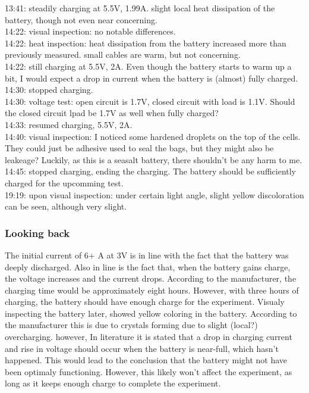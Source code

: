 13:41: steadily charging at 5.5V, 1.99A. slight local heat dissipation of the battery, though not even near concerning.\\
14:22: visual inspection: no notable differences.\\
14:22: heat inspection: heat dissipation from the battery increased more than previously measured. small cables are warm, but not concerning.\\
14:22: still charging at 5.5V, 2A. Even though the battery starts to warm up a bit, I would expect a drop in current when the battery is (almost) fully charged.\\
14:30: stopped charging.\\
14:30: voltage test: open circuit is 1.7V, closed circuit with load is 1.1V. Should the closed circuit lpad be 1.7V as well when fully charged?\\
14:33: resumed charging, 5.5V, 2A.\\
14:40: visual inspection: I noticed some hardened droplets on the top of the cells. They could just be adhesive used to seal the bags, but they might also be leakeage? Luckily, as this is a seasalt battery, there shouldn't be any harm to me.\\
14:45: stopped charging, ending the charging. The battery should be sufficiently charged for the upcomming test. \\
19:19: upon visual inspection: under certain light angle, slight yellow discoloration can be seen, although very slight. 


\subsubsection{\textbf{Looking back}}
The initial current of 6+ A at 3V is in line with the fact that the battery was deeply discharged. Also in line is the fact that, when the battery gains charge, the voltage increases and the current drops. According to the manufacturer, the charging time would be approximately eight hours. However, with three hours of charging, the battery should have enough charge for the experiment. Visualy inspecting the battery later, showed yellow coloring in the battery. According to the manufacturer this is due to crystals forming due to slight (local?) overcharging. however, In literature it is stated that a drop in charging current and rise in voltage should occur when the battery is near-full, which hasn't happened. This would lead to the conclusion that the battery might not have been optimaly functioning. However, this likely won't affect the experiment, as long as it keeps enough charge to complete the experiment.

